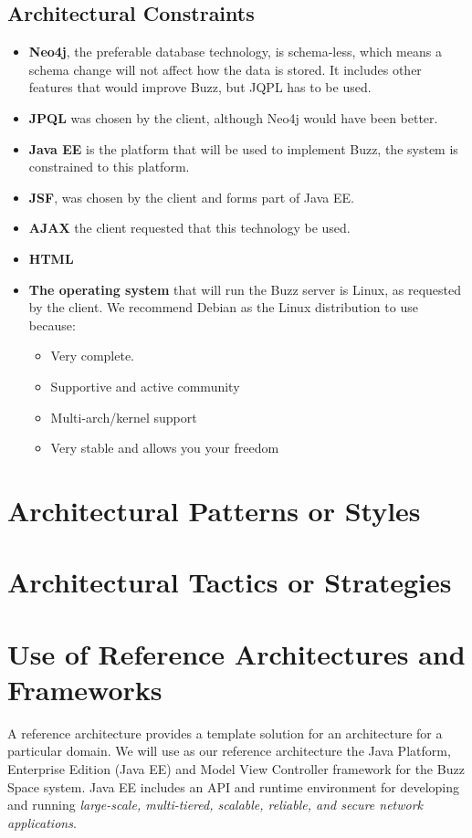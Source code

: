 \documentclass[a4paper,12pt,titlepage]{article}
\begin{document}
\subsection{Architectural Constraints}
	\begin{itemize}
		\item\textbf{Neo4j}, the preferable database technology, is schema-less, which means a schema change will not affect how the data is stored. It includes other features that would improve Buzz, but JQPL has to be used. \\ 
		\item\textbf{JPQL} was chosen by the client, although Neo4j would have been better. \\ 
		\item\textbf{Java EE} is the platform that will be used to implement Buzz, the system is constrained to this platform. \\ 
		\item\textbf{JSF}, was chosen by the client and forms part of Java EE. \\ 
		\item\textbf{AJAX} the client requested that this technology be used.  \\ 
		\item\textbf{HTML} \\
		\item\textbf{The operating system} that will run the Buzz server is Linux, as requested by the client. We recommend Debian as the Linux distribution to use because:  
		\begin{itemize}
			\item Very complete.
			\item Supportive and active community 
			\item Multi-arch/kernel support
			\item Very stable and allows you your freedom
		\end{itemize}
		\end{itemize}
\newpage
\section{Architectural Patterns or Styles}%
\newpage
\section{Architectural Tactics or Strategies}%
\newpage
\section{Use of Reference Architectures and Frameworks}%
A reference architecture provides a template solution for an architecture for a particular domain. We will use as our reference architecture the Java Platform, Enterprise Edition (Java EE) and Model View Controller framework for the Buzz Space system. 
Java EE includes an API and runtime environment for developing and running \textit{large-scale, multi-tiered, scalable, reliable, and secure network applications}.
\end{document}
